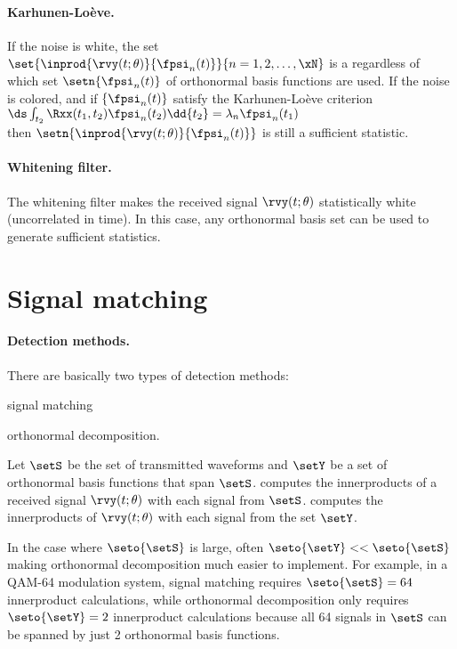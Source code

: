 \paragraph{Karhunen-Lo\`{e}ve.}
If the noise is white, the set $\set{\inprod{\rvy(t;\theta)}{\fpsi_n(t)}}{n=1,2,\ldots,\xN}$
is a  regardless of which
set $\setn{\fpsi_n(t)}$ of orthonormal basis functions are used.
If the noise is colored, and if $\{\fpsi_n(t)\}$ satisfy the
Karhunen-Lo\`{e}ve criterion
\\\indentx$\ds\int_{t_2}\Rxx(t_1,t_2)\fpsi_n(t_2)\dd{t_2} = \lambda_n \fpsi_n(t_1)$\\
then $\setn{\inprod{\rvy(t;\theta)}{\fpsi_n(t)}}$ is still a sufficient statistic.

\paragraph{Whitening filter.}
The whitening filter makes the received signal $\rvy(t;\theta)$ statistically white
(uncorrelated in time). In this case,
any orthonormal basis set can be used to generate sufficient statistics.




\section{Signal matching}
\paragraph{Detection methods.}
There are basically two types of detection methods:
\begin{enume}
   \item signal matching
   \item orthonormal decomposition.
\end{enume}

Let $\setS$ be the set of transmitted waveforms and
$\setY$ be a set of orthonormal basis functions that span $\setS$.
 computes the innerproducts of a
received signal $\rvy(t;\theta)$ with each signal from $\setS$.
 computes the innerproducts of
$\rvy(t;\theta)$ with each signal from the set $\setY$.

In the case where $\seto{\setS}$ is large, often $\seto{\setY}<<\seto{\setS}$
making orthonormal decomposition much easier to implement.
For example, in a QAM-64 modulation system,
signal matching requires $\seto{\setS}=64$ innerproduct calculations,
while orthonormal decomposition only requires $\seto{\setY}=2$
innerproduct calculations because all 64 signals in $\setS$ can be spanned
by just 2 orthonormal basis functions.

